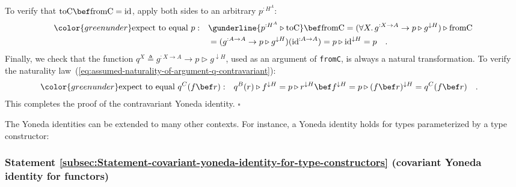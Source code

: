 To verify that $\text{toC}\bef\text{fromC}=\text{id}$, apply both
sides to an arbitrary $p^{:H^{A}}$:
\begin{align*}
{\color{greenunder}\text{expect to equal }p:}\quad & \gunderline{p^{:H^{A}}\triangleright\text{toC}}\bef\text{fromC}=(\forall X.\,g^{:X\rightarrow A}\rightarrow p\triangleright g^{\downarrow H})\triangleright\text{fromC}\\
 & =(g^{:A\rightarrow A}\rightarrow p\triangleright g^{\downarrow H})(\text{id}^{:A\rightarrow A})=p\triangleright\text{id}^{\downarrow H}=p\quad.
\end{align*}
Finally, we check that the function $q^{X}\triangleq g^{:X\rightarrow A}\rightarrow p\triangleright g^{\downarrow H}$,
used as an argument of \lstinline!fromC!,
is always a natural transformation. To verify the naturality law~(\ref{eq:assumed-naturality-of-argument-q-contravariant}):
\begin{align*}
{\color{greenunder}\text{expect to equal }q^{C}(f\bef r):}\quad & q^{B}(r)\triangleright f^{\downarrow H}=p\triangleright r^{\downarrow H}\bef f^{\downarrow H}=p\triangleright(f\bef r)^{\downarrow H}=q^{C}(f\bef r)\quad.
\end{align*}
This completes the proof of the contravariant Yoneda identity. $\square$

The Yoneda identities can be extended to many other contexts. For
instance, a Yoneda identity holds for types parameterized by a type
constructor:

\subsubsection{Statement \label{subsec:Statement-covariant-yoneda-identity-for-type-constructors}\ref{subsec:Statement-covariant-yoneda-identity-for-type-constructors}
(covariant Yoneda identity for functors)}

